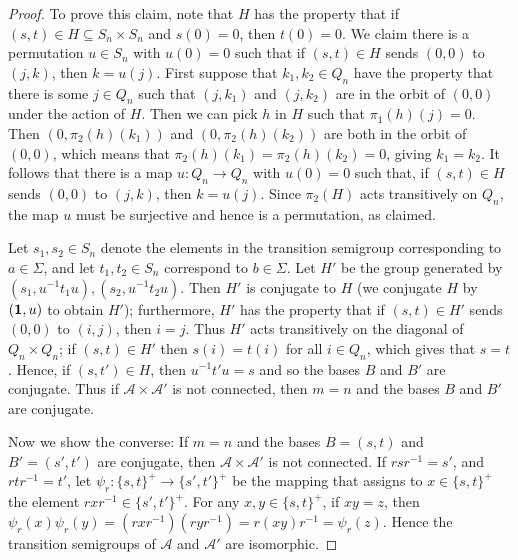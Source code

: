 \documentclass{llncs}
\newcommand{\cA}{{\mathcal A}}
\begin{document}
\begin{proof}
To prove this claim, note that $H$ has the property that if $(s,t)\in H\subseteq S_n\times S_n$ and $s(0)=0$, then $t(0)=0$.  
We claim there is a permutation $u \in S_n$ with $u(0)=0$ such that if $(s,t)\in H$ sends $(0,0)$ to $(j,k)$, then $k=u(j)$. First suppose that $k_1,k_2\in Q_n$ have the property that there is some $j\in Q_n$ such that $(j,k_1)$ and $(j,k_2)$ are in the orbit of $(0,0)$ under the action of $H$.  Then we can pick $h$ in $H$ such that $\pi_1(h)(j)=0$.  Then $(0,\pi_2(h)(k_1))$ and $(0,\pi_2(h)(k_2))$ are both in the orbit of $(0,0)$, which means that $\pi_2(h)(k_1)=\pi_2(h)(k_2) =0$, giving $k_1=k_2$.  It follows that there is a map $u\colon Q_n\to Q_n$ with $u(0)=0$ such that,
if $(s,t)\in H$ sends $(0,0)$ to $(j,k)$, then $k=u(j)$.  Since $\pi_2(H)$ acts transitively on $Q_n$, the map $u$ must be surjective and hence is a permutation, as claimed.

Let $s_1,s_2\in S_n$ denote the elements in the transition semigroup corresponding to $a\in \Sigma$, and let $t_1,t_2\in S_n$  correspond to $b\in \Sigma$.   
Let $H'$ be the group generated by $(s_1, u^{-1} t_1 u), (s_2,u^{-1} t_2  u)$.
Then $H'$ is conjugate to $H$ (we conjugate $H$ by $ ({\bf 1},u)$ to obtain $H'$); furthermore, $H'$  has the property that if $(s,t)\in H'$ sends $(0,0)$ to $(i,j)$, then $i=j$.  Thus $H'$ acts transitively on the diagonal of $Q_n\times Q_n$; if $(s,t) \in H'$ then $s(i)=t(i)$ for all $i\in Q_n$, which gives that $s=t$. Hence, if $(s,t')\in H$, then  $u^{-1}t' u=s$ and so the bases $B$ and $B'$ are conjugate.  
Thus if   
$\cA\times \cA'$ is not connected, then $m=n$ and the bases $B$ and $B'$ are conjugate.


 Now we show the converse: If $m=n$ and the bases $B=(s,t)$ and $B'=(s',t')$ are conjugate, then $\cA\times \cA'$ is not connected.
If  $rsr^{-1}=s'$, and  $rtr^{-1}=t'$, 
let $\psi_r\colon \{s,t\}^+\to \{s',t'\}^+$ be the mapping that assigns to  $x\in \{s,t\}^+$ the element 
$rxr^{-1}\in \{s',t'\}^+$.
For any $x,y\in \{s,t\}^+$, if $xy=z$, then 
$\psi_r(x)\psi_r(y)=(rxr^{-1})(ryr^{-1})=r(xy)r^{-1}=\psi_r(z)$.
Hence  the transition semigroups of $\cA$ and $\cA'$ are isomorphic.


\end{proof}
\end{document}
